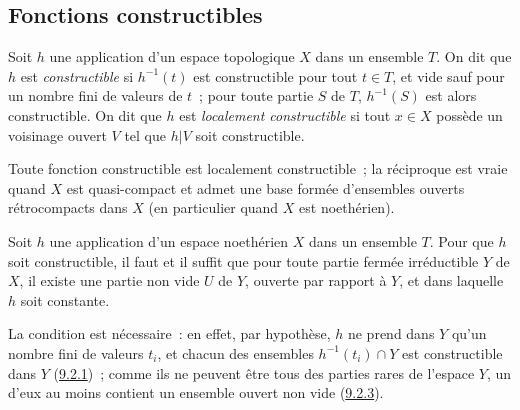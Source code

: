 \subsection{Fonctions constructibles}
\label{subsection:0.9.3-fr}

\begin{definition}[9.3.1]
\label{0.9.3.1-fr}
Soit $h$ une application d'un espace topologique $X$ dans un ensemble $T$.
On dit que $h$ est \emph{constructible} si $h^{-1}(t)$ est constructible pour
tout $t\in T$, et vide sauf pour un nombre fini de valeurs de $t$~; pour
toute partie $S$ de $T$, $h^{-1}(S)$ est alors constructible. On dit que $h$
est \emph{localement constructible} si tout $x\in X$ possède un voisinage
ouvert $V$ tel que $h|V$ soit constructible.
\end{definition}

Toute fonction constructible est localement constructible~; la réciproque
est vraie quand $X$ est quasi-compact et admet une base formée d'ensembles
ouverts rétrocompacts dans $X$ (en particulier quand $X$ est noethérien).

\begin{proposition}[9.3.2]
\label{0.9.3.2-fr}
Soit $h$ une application d'un espace noethérien $X$ dans un ensemble $T$.
Pour que $h$ soit constructible, il faut et il suffit que pour toute partie
fermée irréductible $Y$ de $X$, il existe une partie non vide $U$ de $Y$,
ouverte par rapport à $Y$, et dans laquelle $h$ soit constante.
\end{proposition}

La condition est nécessaire~: en effet, par hypothèse, $h$ ne prend dans $Y$
qu'un nombre fini de valeurs $t_i$, et chacun des ensembles
$h^{-1}(t_i)\cap Y$ est constructible dans $Y$
(\hyperref[0.9.2.1-fr]{9.2.1})~; comme ils ne peuvent être tous des parties
rares de l'espace $Y$, un d'eux au moins contient un ensemble ouvert non vide
(\hyperref[0.9.2.3-fr]{9.2.3}).


